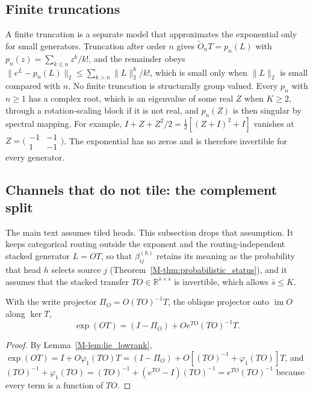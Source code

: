 \documentclass[twoside,11pt]{article}
\begin{document}
\subsection{Finite truncations}
\label{supp:truncations}

A finite truncation is a separate model that approximates the exponential only for small generators. Truncation after order $n$ gives $\widetilde O_nT=p_n(L)$ with $p_n(z)=\sum_{k\le n}z^k/k!$, and the remainder obeys $\|e^{L}-p_n(L)\|_2\le\sum_{k>n}\|L\|_2^k/k!$, which is small only when $\|L\|_2$ is small compared with $n$. No finite truncation is structurally group valued. Every $p_n$ with $n\ge1$ has a complex root, which is an eigenvalue of some real $Z$ when $K\ge2$, through a rotation-scaling block if it is not real, and $p_n(Z)$ is then singular by spectral mapping. For example, $I+Z+Z^2/2=\tfrac12[(Z+I)^2+I]$ vanishes at $Z=\bigl(\begin{smallmatrix}-1&-1\\1&-1\end{smallmatrix}\bigr)$. The exponential has no zeros and is therefore invertible for every generator.

\subsection{Channels that do not tile: the complement split}
\label{supp:complement}

The main text assumes tiled heads. This subsection drops that assumption. It keeps categorical routing outside the exponent and the routing-independent stacked generator $L=OT$, so that $\beta_{ij}^{(h)}$ retains its meaning as the probability that head $h$ selects source $j$ (Theorem~\ref{M-thm:probabilistic_status}), and it assumes that the stacked transfer $TO\in\mathbb R^{\bar s\times\bar s}$ is invertible, which allows $\bar s\le K$.

\begin{lemma}
\label{lem:lie_complement}
With the write projector $\Pi_O=O(TO)^{-1}T$, the oblique projector onto $\operatorname{im}O$ along $\ker T$,
\begin{equation}
\exp(OT)=(I-\Pi_O)+Oe^{TO}(TO)^{-1}T.
\label{eq:lie_complement}
\end{equation}
\end{lemma}
\begin{proof}
By Lemma~\ref{M-lem:lie_lowrank}, $\exp(OT)=I+O\varphi_1(TO)T=(I-\Pi_O)+O[(TO)^{-1}+\varphi_1(TO)]T$, and $(TO)^{-1}+\varphi_1(TO)=(TO)^{-1}+(e^{TO}-I)(TO)^{-1}=e^{TO}(TO)^{-1}$ because every term is a function of $TO$.
\end{proof}
\end{document}
